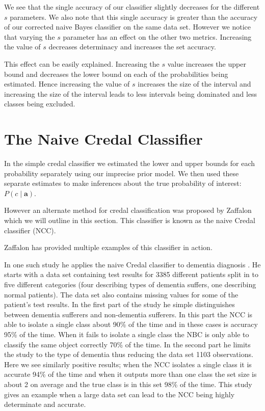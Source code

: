 We see that the single accuracy of our classifier slightly decreases for the different $s$ parameters.
We also note that this single accuracy is greater than the accuracy of our corrected naive Bayes classifier on the same data set.
However we notice that varying the $s$ parameter has an effect on the other two metrics.
Increasing the value of $s$ decreases determinacy and increases the set accuracy.

This effect can be easily explained.
Increasing the $s$ value increases the upper bound and decreases the lower bound on each of the probabilities being estimated.
Hence increasing the value of $s$ increases the size of the interval and increasing the size of the interval leads to less intervals being dominated and less classes being excluded.

\section{The Naive Credal Classifier}
In the simple credal classifier we estimated the lower and upper bounds for each probability separately using our imprecise prior model.
We then used these separate estimates to make inferences about the true probability of interest: $P(c \mid \mathbf{a})$.

However an alternate method for credal classification was proposed by Zaffalon \cite{Zaffalon01} which we will outline in this section.
This classifier is known as the naive Credal classifier (NCC).

Zaffalon has provided multiple examples of this classifier in action.

In one such study he applies the naive Credal classifier to dementia diagnosis \cite{Zaffalon03}.
He starts with a data set containing test results for 3385 different patients split in to five different categories (four describing types of dementia suffers, one describing normal patients).
The data set also contains missing values for some of the patient's test results.
In the first part of the study he simple distinguishes between dementia sufferers and non-dementia sufferers.
In this part the NCC is able to isolate a single class about 90\% of the time and in these cases is accuracy 95\% of the time.
When it fails to isolate a single class the NBC is only able to classify the same object correctly 70\% of the time.
In the second part he limits the study to the type of dementia thus reducing the data set  1103 observations.
Here we see similarly positive results; when the NCC isolates a single class it is accurate 94\% of the time and when it outputs more than one class the set size is about 2 on average and the true class is in this set 98\% of the time.
This study gives an example when a large data set can lead to the NCC being highly determinate and accurate.

